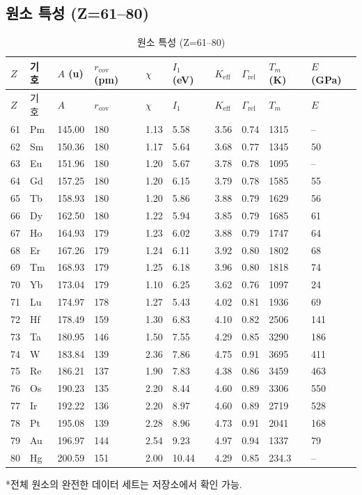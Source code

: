\documentclass[12pt,a4paper]{article}
\newcommand{\Keff}{K_{\mathrm{eff}}}
\begin{document}
	\subsection*{원소 특성 (Z=61–80)}
	
	\begin{longtable}{p{0.6cm}p{1.2cm}p{1.2cm}p{1.2cm}p{1.2cm}p{1.2cm}p{1.5cm}p{1.2cm}p{1.2cm}p{1.2cm}}
		\caption{원소 특성 (Z=61–80)} \label{tab:elem-data-61to80} \\
		\toprule
		\(Z\) & 기호 & \(A\) (u) & \(r_{\text{cov}}\) (pm) & \(\chi\) & \(I_1\) (eV) & \(\Keff\) & \(\Gamma_{\text{rel}}\) & \(T_m\) (K) & \(E\) (GPa) \\
		\midrule
		\endfirsthead
		\toprule
		\(Z\) & 기호 & \(A\) & \(r_{\text{cov}}\) & \(\chi\) & \(I_1\) & \(\Keff\) & \(\Gamma_{\text{rel}}\) & \(T_m\) & \(E\) \\
		\midrule
		\endhead
		61 & Pm & 145.00 & 180 & 1.13 & 5.58 & 3.56 & 0.74 & 1315 & – \\
		62 & Sm & 150.36 & 180 & 1.17 & 5.64 & 3.68 & 0.77 & 1345 & 50 \\
		63 & Eu & 151.96 & 180 & 1.20 & 5.67 & 3.78 & 0.78 & 1095 & – \\
		64 & Gd & 157.25 & 180 & 1.20 & 6.15 & 3.79 & 0.78 & 1585 & 55 \\
		65 & Tb & 158.93 & 180 & 1.20 & 5.86 & 3.88 & 0.79 & 1629 & 56 \\
		66 & Dy & 162.50 & 180 & 1.22 & 5.94 & 3.85 & 0.79 & 1685 & 61 \\
		67 & Ho & 164.93 & 179 & 1.23 & 6.02 & 3.88 & 0.79 & 1747 & 64 \\
		68 & Er & 167.26 & 179 & 1.24 & 6.11 & 3.92 & 0.80 & 1802 & 68 \\
		69 & Tm & 168.93 & 179 & 1.25 & 6.18 & 3.96 & 0.80 & 1818 & 74 \\
		70 & Yb & 173.04 & 179 & 1.10 & 6.25 & 3.62 & 0.76 & 1097 & 24 \\
		71 & Lu & 174.97 & 178 & 1.27 & 5.43 & 4.02 & 0.81 & 1936 & 69 \\
		72 & Hf & 178.49 & 159 & 1.30 & 6.83 & 4.10 & 0.82 & 2506 & 141 \\
		73 & Ta & 180.95 & 146 & 1.50 & 7.55 & 4.29 & 0.85 & 3290 & 186 \\
		74 & W  & 183.84 & 139 & 2.36 & 7.86 & 4.75 & 0.91 & 3695 & 411 \\
		75 & Re & 186.21 & 137 & 1.90 & 7.83 & 4.38 & 0.86 & 3459 & 463 \\
		76 & Os & 190.23 & 135 & 2.20 & 8.44 & 4.60 & 0.89 & 3306 & 550 \\
		77 & Ir & 192.22 & 136 & 2.20 & 8.97 & 4.60 & 0.89 & 2719 & 528 \\
		78 & Pt & 195.08 & 139 & 2.28 & 8.96 & 4.73 & 0.91 & 2041 & 168 \\
		79 & Au & 196.97 & 144 & 2.54 & 9.23 & 4.97 & 0.94 & 1337 & 79 \\
		80 & Hg & 200.59 & 151 & 2.00 & 10.44 & 4.29 & 0.85 & 234.3 & – \\
		\bottomrule
	\end{longtable}
	*전체 원소의 완전한 데이터 세트는 저장소에서 확인 가능.
	
\end{document}
